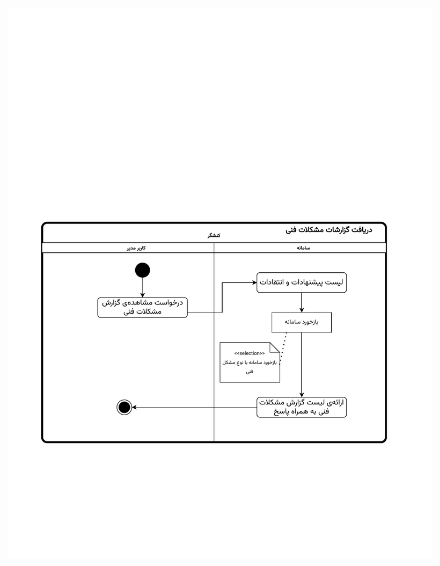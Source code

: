 \begin{figure}[ht!]
	\centering
	\includegraphics[scale=0.8, page=1]{figs/OOD-activity-techrep.pdf}
\end{figure}
\FloatBarrier
\newpage

